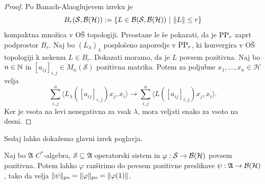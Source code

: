 \begin{proof}
    Po Banach-Alaoglujevem izreku je
    $$B_r (\mathcal{S}, \operatorname{\mathcal{B} (\mathcal{H})}) := \{L \in \mathcal{B} (\mathcal{S}, \operatorname{\mathcal{B} (\mathcal{H})})\ |\ \| L\| \leq r\}$$
    kompaktna množica v OŠ topologiji. Preostane le še pokazati, da je $\operatorname{PP}_r$ zaprt podprostor $B_r$.
    Naj bo $(L_\lambda)_\lambda$ posplošeno zaporedje v $\operatorname{PP}_r$, ki konvergira v OŠ topologiji k nekemu $L \in B_r$.
    Dokazati moramo, da je $L$ povsem pozitivna. Naj bo $n \in \mathbb N$ in $[a_{ij}]_{i, j} \in M_n (\mathcal{S})$ pozitivna matrika.
    Potem za poljubne $x_1, \dots, x_n \in \mathcal{H}$ velja
    $$\sum_{i, j} ^n \langle L_\lambda  ([a_{ij}]_{i, j})x_j, x_i \rangle \to \sum_{i, j} ^n \langle L  ([a_{ij}]_{i, j}) x_j, x_i \rangle.$$
    Ker je vsota na levi nenegativna za vsak $\lambda$, mora veljati enako za vsoto na desni.
\end{proof}

Sedaj lahko dokažemo glavni izrek poglavja.

\begin{izrek}[Arveson]\label{izr:1.3}
    Naj bo $\mathfrak{A}$ $C^*$-algebra, $\mathcal{S} \subseteq \mathfrak{A}$ operatorski sistem in $\varphi: \mathcal{S} \to \operatorname{\mathcal{B} (\mathcal{H})}$ povsem pozitivna.
    Potem lahko $\varphi$ razširimo do povsem pozitivne preslikave $\psi: \mathfrak{A} \to \operatorname{\mathcal{B} (\mathcal{H})}$, tako da velja
    $\| \psi \|_{\operatorname{po}} = \| \varphi \|_{\operatorname{po}} = \| \varphi (1)\|$.
\end{izrek}

